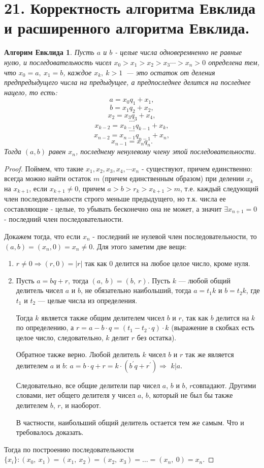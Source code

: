 \documentclass[a4paper,12pt]{article}
\newtheorem*{Evc} {Алгорим Евклида}
\newcommand{\p}{^{\prime}}
\begin{document}
		\section*{21. Корректность алгоритма Евклида и расширенного алгоритма Евклида.}
		\begin{Evc}
		Пусть $a$ и $b$ - целые числа одноверемненно не равные нулю, и последовательность чисел
		$ x_0 > x_1 > x_2 > x_3 \cdots > x_n > 0$
		определена тем, что $x_0 = a,\ x_1 = b$, каждое $x_k,\ k > 1$ — это остаток от деления предпредыдущего числа на предыдущее, а предпоследнее делится на последнее нацело, то есть:
		$$a = x_0q_1 + x_1,$$
		$$b = x_1q_2 + x_2,$$
		$$x_2 = x_3q_3 + x_4,$$
		$$\cdots$$
		$$x_{k-2} = x_{k-1} q_{k-1} + x_k,$$
		$$\cdots$$
		$$x_{n-2} = x_{n-1}q_{n-1}+ x_n,$$
		$$x_{n-1} = x_n q_n.$$
		Тогда $(a, b)$ равен $x_n$, последнему ненулевому члену этой последовательности.
		\end{Evc}
		\begin{proof}
			Поймем, что такие $x_1, x_2, x_3, x_4, \cdots x_n$ - существуют, причем единственно: всегда можно найти остаток $m$ (причем единственным образом) при делении $x_k$ на $x_{k + 1}$, если $x_{k + 1} \ne 0$, причем $a > b > r_k > x_{k + 1} > m$, т.е. каждый следующий член последовательности строго меньше предыдущего, но т.к. числа ее составляющие - целые, то убывать бесконечно она не может, а значит $\exists x_{n + 1} = 0$ - последний член последовательности.

			Докажем тогда, что если $x_n$ - последний не нулевой член последовательности, то $(a, b) = (x_n, 0) = x_n \ne 0$. Для этого заметим две вещи:
			\begin{enumerate}
				\item $r \ne 0 \Rightarrow (r, 0) = |r|$ так как 0 делится на любое целое число, кроме нуля.

				\item Пусть $a = bq + r$, тогда $(a,\ b) = (b,\ r)$.
				Пусть $k$ — любой общий делитель чисел $a$ и $b$, не обязательно наибольший, тогда $a = t_1k$ и $b = t_2k$, где $t_1$ и $t_2$ — целые числа из определения.

				Тогда $k$ является также общим делителем чисел $b$ и $r$, так как $b$ делится на $k$ по определению, а $r = a - b\cdot q = (t_1 - t_2\cdot q)\cdot k$ (выражение в скобках есть целое число, следовательно, $k$ делит $r$ без остатка).

				Обратное также верно. Любой делитель $k$ чисел $b$ и $r$ так же является делителем $a$ и $b$: $a = b \cdot q + r = k\cdot (b\p q + r\p)$$\Rightarrow$ $k|a$.

				Следовательно, все общие делители пар чисел $a$, $b$ и $b$, $r$совпадают. Другими словами, нет общего делителя у чисел $a$, $b$, который не был бы также делителем $b$, $r$, и наоборот.

				В частности, наибольший общий делитель остается тем же самым. Что и требовалось доказать.
			\end{enumerate}

			Тогда по построению последовательности $\{x_i\}: (x_0,\ x_1) = (x_1,\ x_2) = (x_2,\ x_3) = \ldots = (x_n,\ 0) = x_n$.
		\end{proof}
\end{document}
